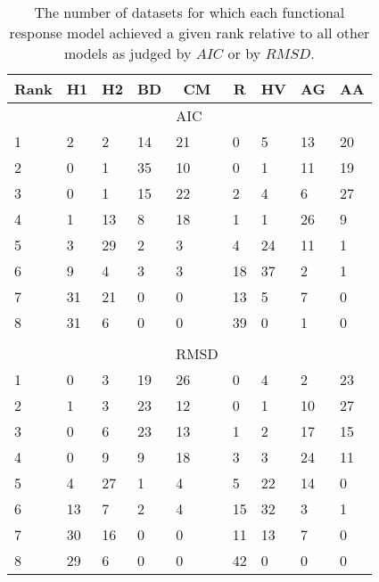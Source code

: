 \begin{table}[!tbp]
\caption{The number of datasets for which each functional response model achieved a given rank relative to all other models as judged by $AIC$ or by $RMSD$.\label{table:AIC_and_RMSD_rankings}} 
\begin{center}
\begin{tabular}{lllllllll}
\hline\hline
\multicolumn{1}{l}{Rank}&\multicolumn{1}{c}{H1}&\multicolumn{1}{c}{H2}&\multicolumn{1}{c}{BD}&\multicolumn{1}{c}{CM}&\multicolumn{1}{c}{R}&\multicolumn{1}{c}{HV}&\multicolumn{1}{c}{AG}&\multicolumn{1}{c}{AA}\tabularnewline
\hline
&&&&AIC&&&&\tabularnewline
1&2&2&14&21&0&5&13&20\tabularnewline
2&0&1&35&10&0&1&11&19\tabularnewline
3&0&1&15&22&2&4&6&27\tabularnewline
4&1&13&8&18&1&1&26&9\tabularnewline
5&3&29&2&3&4&24&11&1\tabularnewline
6&9&4&3&3&18&37&2&1\tabularnewline
7&31&21&0&0&13&5&7&0\tabularnewline
8&31&6&0&0&39&0&1&0\tabularnewline
&&&&&&&&\tabularnewline
&&&&RMSD&&&&\tabularnewline
1&0&3&19&26&0&4&2&23\tabularnewline
2&1&3&23&12&0&1&10&27\tabularnewline
3&0&6&23&13&1&2&17&15\tabularnewline
4&0&9&9&18&3&3&24&11\tabularnewline
5&4&27&1&4&5&22&14&0\tabularnewline
6&13&7&2&4&15&32&3&1\tabularnewline
7&30&16&0&0&11&13&7&0\tabularnewline
8&29&6&0&0&42&0&0&0\tabularnewline
\hline
\end{tabular}\end{center}
\end{table}
